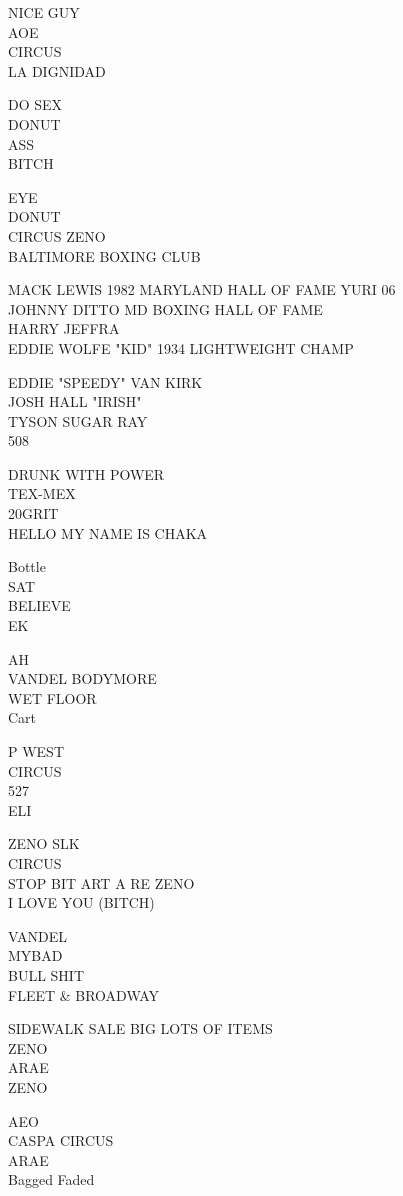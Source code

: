 \documentclass[10pt,letterpaper]{article}
\begin{document}
NICE GUY\\
AOE\\
CIRCUS\\
LA DIGNIDAD

DO SEX\\
DONUT\\
ASS\\
BITCH

EYE\\
DONUT\\
CIRCUS ZENO\\
BALTIMORE BOXING CLUB

MACK LEWIS 1982 MARYLAND HALL OF FAME YURI 06\\
JOHNNY DITTO MD BOXING HALL OF FAME\\
HARRY JEFFRA\\
EDDIE WOLFE "KID" 1934 LIGHTWEIGHT CHAMP

EDDIE "SPEEDY" VAN KIRK\\
JOSH HALL "IRISH"\\
TYSON SUGAR RAY\\
508

DRUNK WITH POWER\\
TEX{-}MEX\\
20GRIT\\
HELLO MY NAME IS CHAKA

Bottle\\
SAT\\
BELIEVE\\
EK

AH\\
VANDEL BODYMORE\\
WET FLOOR\\
Cart

P WEST\\
CIRCUS\\
527\\
ELI

ZENO SLK\\
CIRCUS\\
STOP BIT ART A RE ZENO\\
I LOVE YOU (BITCH)

VANDEL\\
MYBAD\\
BULL SHIT\\
FLEET \& BROADWAY

SIDEWALK SALE BIG LOTS OF ITEMS\\
ZENO\\
ARAE\\
ZENO

AEO\\
CASPA CIRCUS\\
ARAE\\
Bagged Faded
\end{document}
